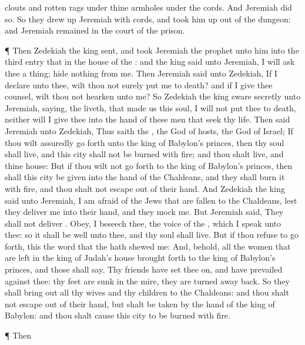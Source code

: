 {clouts and rotten
rags under thine
armholes under the
cords. And
Jeremiah
did so.
So they drew
up
Jeremiah with
cords, and took him
up out of the
dungeon: and
Jeremiah
remained in the
court of the
prison.
\par }{\PP {}¶ Then
Zedekiah the
king
sent, and
took
Jeremiah the
prophet unto him into the
third
entry that
{} in the
house of the
{}: and the
king
said unto
Jeremiah, I will
ask thee a
thing;
hide nothing from me.
Then
Jeremiah
said unto
Zedekiah, If I
declare
{} unto thee, wilt thou not
surely put me to
death? and if I give thee
counsel, wilt thou not
hearken unto me?
So
Zedekiah the
king
sware
secretly unto
Jeremiah,
saying,
{} the
{}
liveth, that
made us this
soul, I will not put thee to
death, neither will I
give thee into the
hand of these
men that
seek thy
life.
Then
said
Jeremiah unto
Zedekiah, Thus
saith the
{}, the
God of
hosts, the
God of
Israel; If thou wilt
assuredly go
forth unto the
king of
Babylon’s
princes, then thy
soul shall
live, and this
city shall not be
burned with
fire; and thou shalt
live, and thine
house:
But if thou wilt not go
forth to the
king of
Babylon’s
princes, then shall this
city be
given into the
hand of the
Chaldeans, and they shall
burn it with
fire, and thou shalt not escape
out of their
hand.
And
Zedekiah the
king
said unto
Jeremiah, I am
afraid of the
Jews that are
fallen to the
Chaldeans, lest they
deliver me into their
hand, and they
mock me.
But
Jeremiah
said, They shall not
deliver
{}.
Obey, I beseech thee, the
voice of the
{}, which I
speak unto thee: so it shall be
well unto thee, and thy
soul shall
live.
But if thou
refuse to go
forth, this
{} the
word that the
{} hath
shewed me:
And, behold, all the
women that are
left in the
king of
Judah’s
house
{} brought
forth to the
king of
Babylon’s
princes, and those
{} shall
say, Thy
friends have set thee
on, and have
prevailed against thee: thy
feet are
sunk in the
mire,
{} they are turned
away
back.
So they shall bring
out all thy
wives and thy
children to the
Chaldeans: and thou shalt not escape
out of their
hand, but shalt be
taken by the
hand of the
king of
Babylon: and thou shalt cause this
city to be
burned with
fire.
\par }{\PP {}¶ Then
}

